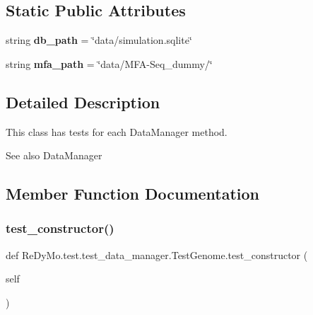 \subsection*{Static Public Attributes}
\begin{DoxyCompactItemize}
\item 
\mbox{\label{classReDyMo_1_1test_1_1test__data__manager_1_1TestGenome_a60390c3741f42b1e12da34142961a664}} 
string {\bfseries db\+\_\+path} = \char`\"{}data/simulation.\+sqlite\char`\"{}
\item 
\mbox{\label{classReDyMo_1_1test_1_1test__data__manager_1_1TestGenome_aa7a1f50d7eb925c9264e95f623ff0611}} 
string {\bfseries mfa\+\_\+path} = \char`\"{}data/M\+FA-\/Seq\+\_\+dummy/\char`\"{}
\end{DoxyCompactItemize}


\subsection{Detailed Description}
This class has tests for each Data\+Manager method. 

\begin{DoxySeeAlso}{See also}
Data\+Manager 
\end{DoxySeeAlso}


\subsection{Member Function Documentation}
\mbox{\label{classReDyMo_1_1test_1_1test__data__manager_1_1TestGenome_abd5b5058c8f3a1b169df451dfb8710de}} 
\subsubsection{\texorpdfstring{test\+\_\+constructor()}{test\_constructor()}}
{\footnotesize\ttfamily def Re\+Dy\+Mo.\+test.\+test\+\_\+data\+\_\+manager.\+Test\+Genome.\+test\+\_\+constructor (\begin{DoxyParamCaption}\item[{}]{self }\end{DoxyParamCaption})}



